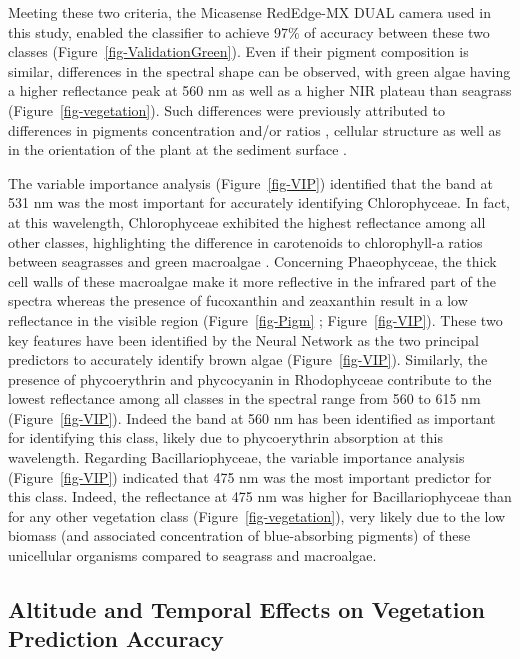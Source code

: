 \documentclass[
  number]{elsarticle}
\begin{document}
Meeting these two criteria, the Micasense RedEdge-MX DUAL camera used in
this study, enabled the classifier to achieve 97\% of accuracy between
these two classes (Figure~\ref{fig-ValidationGreen}). Even if their
pigment composition is similar, differences in the spectral shape can be
observed, with green algae having a higher reflectance peak at 560 nm as
well as a higher NIR plateau than seagrass
(Figure~\ref{fig-vegetation}). Such differences were previously
attributed to differences in pigments concentration and/or ratios
\citep{bargain2013seasonal}, cellular structure as well as in the
orientation of the plant at the sediment surface \citetext{\citealp[
]{beach1997vivo}; \citealp[
]{kirk1994light}; \citealp{hedley2018influence}}.

The variable importance analysis (Figure~\ref{fig-VIP}) identified that
the band at 531 nm was the most important for accurately identifying
Chlorophyceae. In fact, at this wavelength, Chlorophyceae exhibited the
highest reflectance among all other classes, highlighting the difference
in carotenoids to chlorophyll-a ratios between seagrasses and green
macroalgae \citep{repolho2017seagrass}. Concerning Phaeophyceae, the
thick cell walls of these macroalgae \citep{charrier2021growth} make it
more reflective in the infrared part of the spectra \citep{Slaton2001}
whereas the presence of fucoxanthin and zeaxanthin result in a low
reflectance in the visible region (Figure~\ref{fig-Pigm} ;
Figure~\ref{fig-VIP}). These two key features have been identified by
the Neural Network as the two principal predictors to accurately
identify brown algae (Figure~\ref{fig-VIP}). Similarly, the presence of
phycoerythrin and phycocyanin in Rhodophyceae contribute to the lowest
reflectance among all classes in the spectral range from 560 to 615 nm
(Figure~\ref{fig-VIP}). Indeed the band at 560 nm has been identified as
important for identifying this class, likely due to phycoerythrin
absorption at this wavelength. Regarding Bacillariophyceae, the variable
importance analysis (Figure~\ref{fig-VIP}) indicated that 475 nm was the
most important predictor for this class. Indeed, the reflectance at 475
nm was higher for Bacillariophyceae than for any other vegetation class
(Figure~\ref{fig-vegetation}), very likely due to the low biomass (and
associated concentration of blue-absorbing pigments) of these
unicellular organisms compared to seagrass and macroalgae.

\subsection{Altitude and Temporal Effects on Vegetation Prediction
Accuracy}\label{altitude-and-temporal-effects-on-vegetation-prediction-accuracy}
\end{document}
